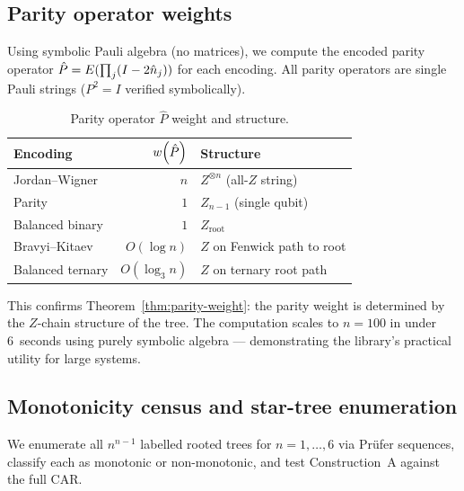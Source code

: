 
\subsection{Parity operator weights}
\label{sec:val-parity}

Using symbolic Pauli algebra (no matrices), we compute the encoded
parity operator $\hat{P} = E(\prod_j (I - 2\hat{n}_{j}))$ for each
encoding.  All parity operators are single Pauli strings ($P^2 = I$
verified symbolically).

\begin{table}[t]
\centering
\caption{Parity operator $\hat{P}$ weight and structure.}
\label{tab:parity}
\begin{tabular}{@{}lrl@{}}
\toprule
\textbf{Encoding} & $w\!\left(\hat{P}\right)$ & \textbf{Structure} \\
\midrule
Jordan--Wigner     & $n$            & $Z^{\otimes n}$ (all-$Z$ string) \\
Parity             & $1$            & $Z_{n-1}$ (single qubit) \\
Balanced binary    & $1$            & $Z_\text{root}$ \\
Bravyi--Kitaev     & $O(\log n)$    & $Z$ on Fenwick path to root \\
Balanced ternary   & $O(\log_3 n)$  & $Z$ on ternary root path \\
\bottomrule
\end{tabular}
\end{table}

This confirms Theorem~\ref{thm:parity-weight}: the parity weight is
determined by the $Z$-chain structure of the tree.  The computation
scales to $n = 100$ in under 6~seconds using purely symbolic algebra
--- demonstrating the library's practical utility for large systems.

\subsection{Monotonicity census and star-tree enumeration}
\label{sec:val-census}

We enumerate all $n^{n-1}$ labelled rooted trees for $n = 1, \ldots, 6$
via Pr\"ufer sequences, classify each as monotonic or non-monotonic,
and test Construction~A against the full CAR.

